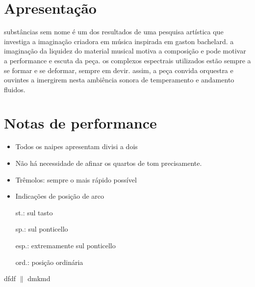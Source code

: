 \documentclass[11pt]{article}
\author{Davi Raubach Tuchtenhagen}
\date{\today}
\title{}
\begin{document}
\section{Apresentação}
\label{sec:org79baa40}
substâncias sem nome é um dos resultados de uma pesquisa artística que investiga a imaginação criadora em música inspirada em gaston bachelard. a imaginação da liquidez do material musical motiva a composição e pode motivar a performance e escuta da peça. os complexos espectrais utilizados estão sempre a se formar e se deformar, sempre em devir. assim, a peça convida orquestra e ouvintes a imergirem nesta ambiência sonora de temperamento e andamento fluidos.

\section{Notas de performance}
\label{sec:orgfd76fe9}

\begin{itemize}
\item Todos os naipes apresentam divisi a dois

\item Não há necessidade de afinar os quartos de tom precisamente.

\item Trêmolos: sempre o mais rápido possível

\item Indicações de posição de arco

st.: sul tasto

sp.: sul ponticello

esp.: extremamente sul ponticello

ord.: posição ordinária
\end{itemize}


dfdf \(\parallel\) dmkmd
\end{document}
